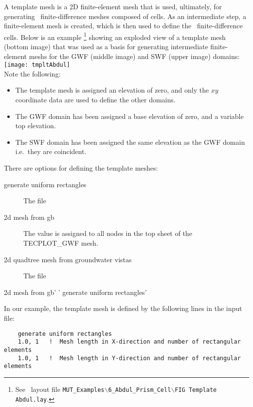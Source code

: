 \label{texfile:TemplateMesh}
A template mesh is a 2D finite-element mesh that is used, ultimately, for generating \mfus\ finite-difference meshes composed of cells.  As an intermediate step, a finite-element mesh is created, which is then used to define the \mf\ finite-difference cells.  Below is an example 
\footnote{See \tecplot\ layout file \texttt{MUT\_Examples$\backslash$6\_Abdul\_Prism\_Cell$\backslash$FIG Template Abdul.lay}. }
  showing an exploded view of a template mesh (bottom image) that was used as a basis for generating intermediate finite-element meshs for the GWF (middle image) and SWF (upper image) domains:
    \vspace{.2in} \\
    \texttt{[image: tmpltAbdul]}
    \vspace{.2in} \\
Note the following:
\begin{itemize}
  \item The template mesh is assigned an elevation of zero, and only the $xy$ coordinate data are used to define the other domains.
  \item The GWF domain has been assigned a base elevation of zero, and a variable top elevation. 
  \item The SWF domain has been assigned the same elevation as the GWF domain i.e.\ they are coincident.
\end{itemize} 


 There are options for defining the template meshes:
\begin{description}
  \item[generate uniform rectangles] The file
  \item[2d mesh from gb] The value is assigned to all nodes in the top sheet of the TECPLOT\_GWF mesh.
  \item[2d quadtree mesh from groundwater vistas] The file
\end{description}
2d mesh from gb'
'
generate uniform rectangles'



In our example, the template mesh is defined by the following lines in the input file:
\begin{verbatim}
    generate uniform rectangles
    1.0, 1   !  Mesh length in X-direction and number of rectangular elements
    1.0, 1   !  Mesh length in Y-direction and number of rectangular elements
\end{verbatim}

